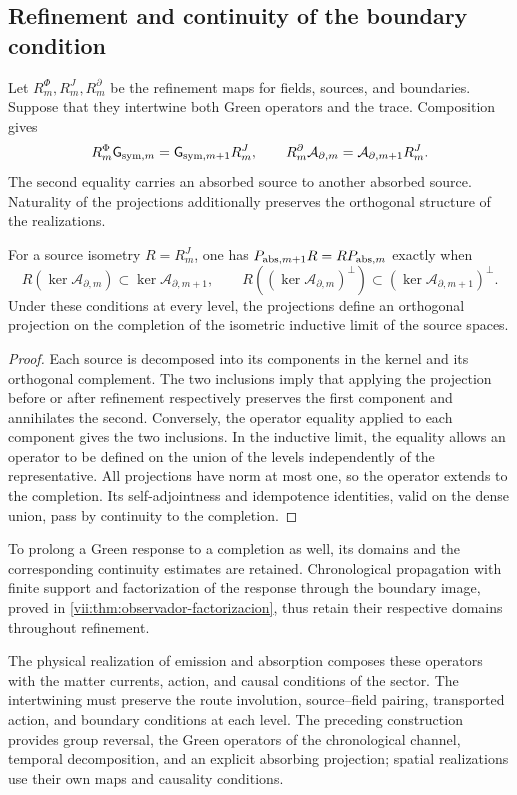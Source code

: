 \subsection{Refinement and continuity of the boundary condition}
\label{vii:subsec:refinamiento-absorcion}

Let \(R_m^\Phi,R_m^J,R_m^\partial\) be the refinement maps for
fields, sources, and boundaries. Suppose that they intertwine both Green
operators and the trace. Composition gives
\begin{equation}
 R_m^\Phi \mathsf{G}_{{\rm sym},m}=\mathsf{G}_{{\rm sym},m+1}R_m^J,\qquad
 R_m^\partial\mathcal A_{\partial,m}
 =\mathcal A_{\partial,m+1}R_m^J.
 \label{vii:eq:refinamiento-lectura-absorcion}
\end{equation}
The second equality carries an absorbed source to another absorbed source.
Naturality of the projections additionally preserves the orthogonal structure
of the realizations.

\begin{proposition}
\label{vii:prop:naturalidad-proyeccion-absorcion}
For a source isometry \(R=R_m^J\), one has
\(P_{{\rm abs},m+1}R=RP_{{\rm abs},m}\) exactly when
\[
 R(\ker\mathcal A_{\partial,m})
       \subset\ker\mathcal A_{\partial,m+1},\qquad
 R((\ker\mathcal A_{\partial,m})^\perp)
       \subset(\ker\mathcal A_{\partial,m+1})^\perp.
\]
Under these conditions at every level, the projections define an orthogonal
projection on the completion of the isometric inductive limit of the source
spaces.
\end{proposition}
\begin{proof}
Each source is decomposed into its components in the kernel and its
orthogonal complement. The two inclusions imply that applying the
projection before or after refinement respectively preserves the first
component and annihilates the second. Conversely, the operator equality
applied to each component gives the two inclusions.
In the inductive limit, the equality allows an operator to be defined on
the union of the levels independently of the representative. All projections
have norm at most one, so the operator extends to the completion.
Its self-adjointness and idempotence identities, valid on the dense union,
pass by continuity to the completion.
\end{proof}

To prolong a Green response to a completion as well, its domains and the
corresponding continuity estimates are retained. Chronological propagation
with finite support and factorization of the response through the boundary
image, proved in \ref{vii:thm:observador-factorizacion}, thus retain their
respective domains throughout refinement.

The physical realization of emission and absorption composes these operators
with the matter currents, action, and causal conditions of the sector.
The intertwining must preserve the route involution, source--field pairing,
transported action, and boundary conditions at each level.
The preceding construction provides group reversal, the Green operators of the
chronological channel, temporal decomposition, and an explicit absorbing
projection; spatial realizations use their own maps and causality conditions.
